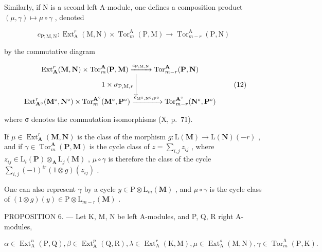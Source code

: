 Similarly, if N is a second left A-module, one defines a composition product \((\mu, \gamma) \mapsto \mu \circ \gamma\) , denoted

\[
c _ {\mathrm{P}; \mathrm{M}, \mathrm{N}}: \operatorname{Ext} _ {\mathrm{A}} ^ {r} (\mathrm{M}, \mathrm{N}) \times \operatorname{Tor} _ {m} ^ {\mathrm{A}} (\mathrm{P}, \mathrm{M}) \rightarrow \operatorname{Tor} _ {m - r} ^ {\mathrm{A}} (\mathrm{P}, \mathrm{N})
\]

by the commutative diagram

\[
\begin{array}{c} \operatorname{Ext} _ {\mathbf {A}} ^ {r} (\mathbf {M}, \mathbf {N}) \times \operatorname{Tor} _ {m} ^ {\mathbf {A}} (\mathbf {P}, \mathbf {M}) \xrightarrow {c _ {\mathrm{P} ; \mathrm{M} , \mathrm{N}}} \operatorname{Tor} _ {m - r} ^ {\mathbf {A}} (\mathbf {P}, \mathbf {N}) \\ 1 \times \sigma_ {\mathrm{P}, \mathrm{M}, r} \Biggl \downarrow \\ \operatorname{Ext} _ {\mathbf {A} ^ {\circ}} ^ {r} (\mathbf {M} ^ {\circ}, \mathbf {N} ^ {\circ}) \times \operatorname{Tor} _ {m} ^ {\mathbf {A} ^ {\circ}} (\mathbf {M} ^ {\circ}, \mathbf {P} ^ {\circ}) \xrightarrow {c _ {\mathrm{M} ^ {\circ} , \mathrm{N} ^ {\circ} ; \mathrm{P} ^ {\circ}}} \operatorname{Tor} _ {m - r} ^ {\mathbf {A} ^ {\circ}} (\mathbf {N} ^ {\circ}, \mathbf {P} ^ {\circ}) \end{array}\tag{12}
\]

where σ denotes the commutation isomorphisms (X, p.~71).

If \(\mu \in \operatorname{Ext}_{\mathbf{A}}^{r}(\mathbf{M}, \mathbf{N})\) is the class of the morphism \(g: \mathrm{L}(\mathbf{M}) \to \mathrm{L}(\mathbf{N})(-r)\) , and if \(\gamma \in \operatorname{Tor}_{m}^{\mathbf{A}}(\mathbf{P}, \mathbf{M})\) is the cycle class of \(z = \sum_{i,j} z_{ij}\) , where \(z_{ij} \in \mathrm{L}_i(\mathbf{P}) \otimes_{\mathbf{A}} \mathrm{L}_j(\mathbf{M})\) , \(\mu \circ \gamma\) is therefore the class of the cycle \(\sum_{i,j} (-1)^{ir}(1 \otimes g)(z_{ij})\) .

One can also represent \(\gamma\) by a cycle \(y \in \mathrm{P} \otimes \mathrm{L}_{m}(\mathbf{M})\) , and \(\mu \circ \gamma\) is the cycle class of \((1 \otimes g)(y) \in \mathrm{P} \otimes \mathrm{L}_{m-r}(\mathbf{M})\) .

PROPOSITION 6. --- Let K, M, N be left A-modules, and P, Q, R right A-modules,

\[
\alpha \in \operatorname{Ext} _ {\mathrm{A}} ^ {n} (\mathrm{P}, \mathrm{Q}), \beta \in \operatorname{Ext} _ {\mathrm{A}} ^ {p} (\mathrm{Q}, \mathrm{R}), \lambda \in \operatorname{Ext} _ {\mathrm{A}} ^ {r} (\mathrm{K}, \mathrm{M}), \mu \in \operatorname{Ext} _ {\mathrm{A}} ^ {s} (\mathrm{M}, \mathrm{N}), \gamma \in \operatorname{Tor} _ {m} ^ {\mathrm{A}} (\mathrm{P}, \mathrm{K}).
\]

